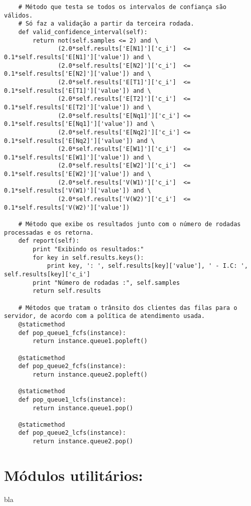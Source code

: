 \begin{verbatim}
    # Método que testa se todos os intervalos de confiança são válidos.
    # Só faz a validação a partir da terceira rodada.
    def valid_confidence_interval(self):
        return not(self.samples <= 2) and \
               (2.0*self.results['E[N1]']['c_i']  <= 0.1*self.results['E[N1]']['value']) and \
               (2.0*self.results['E[N2]']['c_i']  <= 0.1*self.results['E[N2]']['value']) and \
               (2.0*self.results['E[T1]']['c_i']  <= 0.1*self.results['E[T1]']['value']) and \
               (2.0*self.results['E[T2]']['c_i']  <= 0.1*self.results['E[T2]']['value']) and \
               (2.0*self.results['E[Nq1]']['c_i'] <= 0.1*self.results['E[Nq1]']['value']) and \
               (2.0*self.results['E[Nq2]']['c_i'] <= 0.1*self.results['E[Nq2]']['value']) and \
               (2.0*self.results['E[W1]']['c_i']  <= 0.1*self.results['E[W1]']['value']) and \
               (2.0*self.results['E[W2]']['c_i']  <= 0.1*self.results['E[W2]']['value']) and \
               (2.0*self.results['V(W1)']['c_i']  <= 0.1*self.results['V(W1)']['value']) and \
               (2.0*self.results['V(W2)']['c_i']  <= 0.1*self.results['V(W2)']['value'])

    # Método que exibe os resultados junto com o número de rodadas processadas e os retorna.
    def report(self):
        print "Exibindo os resultados:"
        for key in self.results.keys():
            print key, ': ', self.results[key]['value'], ' - I.C: ', self.results[key]['c_i']
        print "Número de rodadas :", self.samples
        return self.results
    
    # Métodos que tratam o trânsito dos clientes das filas para o servidor, de acordo com a política de atendimento usada.
    @staticmethod
    def pop_queue1_fcfs(instance):
        return instance.queue1.popleft()
        
    @staticmethod
    def pop_queue2_fcfs(instance):
        return instance.queue2.popleft()
        
    @staticmethod
    def pop_queue1_lcfs(instance):
        return instance.queue1.pop()
        
    @staticmethod
    def pop_queue2_lcfs(instance):
        return instance.queue2.pop()
\end{verbatim}

\section{Módulos utilitários:}
bla
